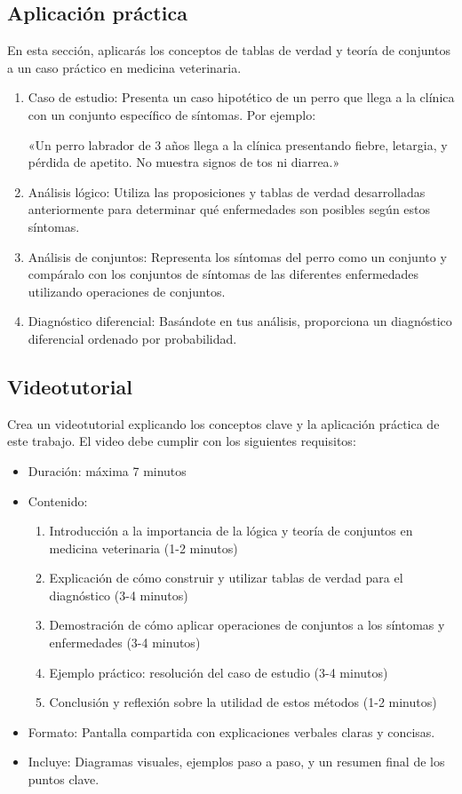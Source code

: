 \documentclass[a4,11pt]{aleph-notas}
\begin{document}
\subsection{Aplicación práctica}
En esta sección, aplicarás los conceptos de tablas de verdad y teoría de conjuntos a un caso práctico en medicina veterinaria.

\begin{enumerate}[leftmargin=*]
    \item Caso de estudio: Presenta un caso hipotético de un perro que llega a la clínica con un conjunto específico de síntomas. Por ejemplo:
    
    «Un perro labrador de 3 años llega a la clínica presentando fiebre, letargia, y pérdida de apetito. No muestra signos de tos ni diarrea.»

    \item Análisis lógico: Utiliza las proposiciones y tablas de verdad desarrolladas anteriormente para determinar qué enfermedades son posibles según estos síntomas.

    \item Análisis de conjuntos: Representa los síntomas del perro como un conjunto y compáralo con los conjuntos de síntomas de las diferentes enfermedades utilizando operaciones de conjuntos.

    \item Diagnóstico diferencial: Basándote en tus análisis, proporciona un diagnóstico diferencial ordenado por probabilidad.
\end{enumerate}

\subsection{Videotutorial}
Crea un videotutorial explicando los conceptos clave y la aplicación práctica de este trabajo. El video debe cumplir con los siguientes requisitos:

\begin{itemize}
    \item Duración: máxima 7 minutos
    \item Contenido:
    \begin{enumerate}
        \item Introducción a la importancia de la lógica y teoría de conjuntos en medicina veterinaria (1-2 minutos)
        \item Explicación de cómo construir y utilizar tablas de verdad para el diagnóstico (3-4 minutos)
        \item Demostración de cómo aplicar operaciones de conjuntos a los síntomas y enfermedades (3-4 minutos)
        \item Ejemplo práctico: resolución del caso de estudio (3-4 minutos)
        \item Conclusión y reflexión sobre la utilidad de estos métodos (1-2 minutos)
    \end{enumerate}
    \item Formato: Pantalla compartida con explicaciones verbales claras y concisas.
    \item Incluye: Diagramas visuales, ejemplos paso a paso, y un resumen final de los puntos clave.
\end{itemize}
\end{document}

